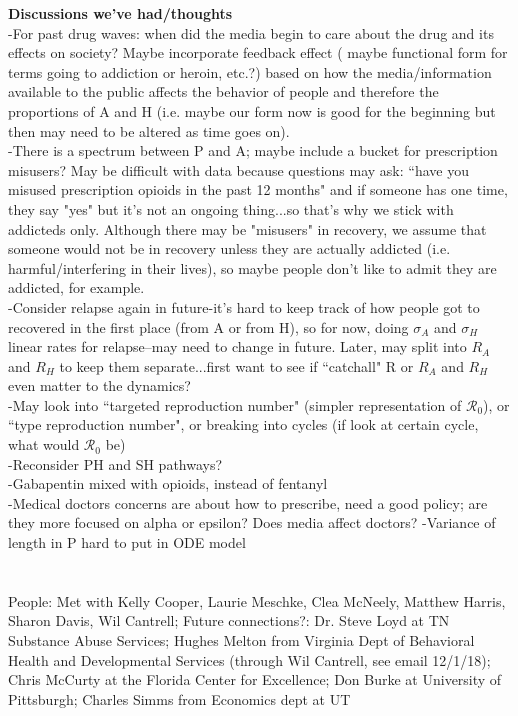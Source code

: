 \documentclass[12pt]{article}
\begin{document}



\textbf{Discussions we've had/thoughts} \\
-For past drug waves: when did the media begin to care about the drug and its effects on society? Maybe incorporate feedback effect ( maybe functional form for terms going to addiction or heroin, etc.?) based on how the media/information available to the public affects the behavior of people and therefore the proportions of A and H (i.e. maybe our form now is good for the beginning but then may need to be altered as time goes on).\\
-There is a spectrum between P and A; maybe include a bucket for prescription misusers? May be difficult with data because questions may ask: ``have you misused prescription opioids in the past 12 months" and if someone has one time, they say "yes" but it's not an ongoing thing...so that's why we stick with addicteds only. Although there may be "misusers" in recovery, we assume that someone would not be in recovery unless they are actually addicted (i.e. harmful/interfering in their lives), so maybe people don't like to admit they are addicted, for example.\\
-Consider relapse again in future-it's hard to keep track of how people got to recovered in the first place (from A or from H), so for now, doing $\sigma_A$ and $\sigma_H$ linear rates for relapse--may need to change in future. Later, may split into $R_A$ and $R_H$ to keep them separate...first want to see if ``catchall" R or $R_A$ and $R_H$ even matter to the dynamics?\\
-May look into ``targeted reproduction number" (simpler representation of $\mathscr{R}_0$), or ``type reproduction number", or breaking into cycles (if look at certain cycle, what would $\mathscr{R}_0$ be)\\
-Reconsider PH and SH pathways? \\
-Gabapentin mixed with opioids, instead of fentanyl \\
-Medical doctors concerns are about how to prescribe, need a good policy; are they more focused on alpha or epsilon? Does media affect doctors? 
-Variance of length in P hard to put in ODE model \\
\\ \\

People: Met with Kelly Cooper, Laurie Meschke, Clea McNeely, Matthew Harris, Sharon Davis, Wil Cantrell; Future connections?: Dr. Steve Loyd at TN Substance Abuse Services; Hughes Melton from Virginia Dept of Behavioral Health and Developmental Services (through Wil Cantrell, see email 12/1/18); Chris McCurty at the Florida Center for Excellence; Don Burke at University of Pittsburgh; Charles Simms from Economics dept at UT
\\ \\
\end{document}
